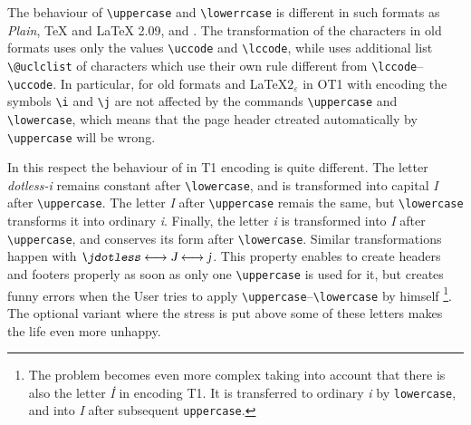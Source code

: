 The behaviour of \verb?\uppercase? and \verb?\lowerrcase? is different in
such formats as {\sl Plain}, \AmS\/\TeX{} and \LaTeX{} 2.09,
and \LaTeXe. The transformation of the characters in old formats
uses only the values \verb?\uccode? and \verb?\lccode?, while
\LaTeXe{} uses additional list \verb?\@uclclist? of characters
which use their own rule different from \verb?\lccode?--\verb?\uccode?.
In particular, for old formats and \LaTeX$2_{\varepsilon}$ in
OT1 with encoding the symbols \verb?\i? and \verb?\j? are not
affected by the commands \verb?\uppercase?
and \verb?\lowercase?, which means that the page header
ctreated automatically by \verb?\uppercase? will be wrong.

In this respect the behaviour of \LaTeXe{}
in T1 encoding is quite different.
The letter {\sl dotless-i} remains constant after
\verb?\lowercase?, and is transformed into capital {\sl I}
after \verb?\uppercase?. The letter {\sl I} after
\verb?\uppercase? remais the same, but \verb?\lowercase?
transforms it into ordinary {\sl i}.
Finally, the letter {\sl i} is transformed into {\sl I}
after \verb?\uppercase?, and conserves its form after
\verb?\lowercase?. Similar transformations happen with
$\hbox{\sl \j} \longleftrightarrow \hbox{\sl J}
\longleftrightarrow\hbox{\sl j}$.
This property enables to create headers and footers
properly as soon as only one \verb?\uppercase? is used for it,
but creates funny errors when the User tries to apply
\verb?\uppercase?--\verb?\lowercase? by himself%
   \footnote{The problem becomes even more complex taking into account
             that there is also the letter {\sl \.I} in encoding T1.
             It is transferred to ordinary {\sl i} by {\tt\bs{}lowercase},
             and into {\sl I} after subsequent {\tt\bs{}uppercase}.}.
The optional variant where the stress is put above some of these
letters makes the life even more unhappy.

